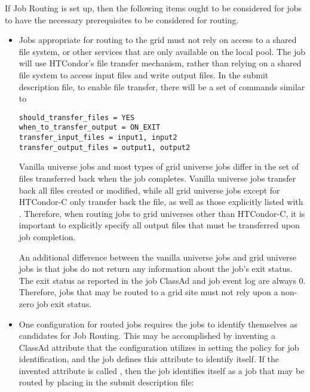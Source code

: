 If Job Routing is set up, then the following items
ought to be considered for jobs to have the
necessary prerequisites to be considered for routing.

\begin{itemize}

\item Jobs appropriate for routing to the grid must not rely on access to
a shared file system, or other services that are only available on the
local pool.
The job will use HTCondor's file transfer mechanism, 
rather than relying on a shared file system
to access input files and write output files.
In the submit description file, to enable file transfer, there
will be a set of commands similar to

\begin{verbatim}
should_transfer_files = YES
when_to_transfer_output = ON_EXIT
transfer_input_files = input1, input2
transfer_output_files = output1, output2
\end{verbatim}

Vanilla universe jobs and most types of grid universe jobs differ in the
set of files transferred back when the job completes.
Vanilla universe jobs transfer back all files created or modified,
while all grid universe jobs except for HTCondor-C only transfer back the  file,
as well as those explicitly listed
with .
Therefore, when routing jobs to grid universes other than HTCondor-C, it is
important to explicitly specify all
output files that must be transferred upon job completion.

An additional difference between the vanilla universe jobs
and  grid universe jobs
is that  jobs do not return
any information about the job's exit status.
The exit status as reported in the job ClassAd and job event log are
always 0.
Therefore, jobs that may be routed to a  grid site
must not rely upon a non-zero job exit status.

\item One configuration for routed jobs requires the jobs to
identify themselves as candidates for Job Routing.
This may be accomplished by inventing a ClassAd attribute
that the configuration utilizes in setting the policy 
for job identification,
and the job defines this attribute to identify itself.
If the invented attribute is called ,
then the job identifies itself as a job that may be routed
by placing in the submit description file:


\end{itemize}
